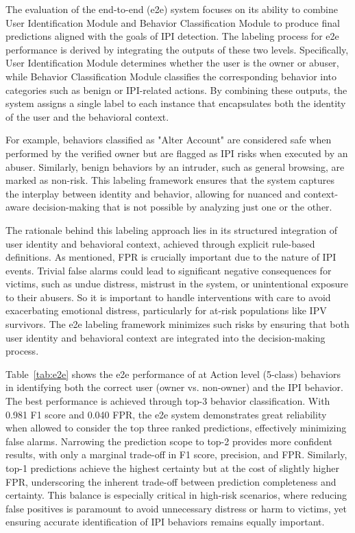     The evaluation of the end-to-end (e2e) system focuses on its ability to combine User Identification Module and Behavior Classification Module to produce final predictions aligned with the goals of IPI detection. The labeling process for e2e performance is derived by integrating the outputs of these two levels. Specifically, User Identification Module determines whether the user is the owner or abuser, while Behavior Classification Module classifies the corresponding behavior into categories such as benign or IPI-related actions. By combining these outputs, the system assigns a single label to each instance that encapsulates both the identity of the user and the behavioral context.

    For example, behaviors classified as "Alter Account" are considered safe when performed by the verified owner but are flagged as IPI risks when executed by an abuser. Similarly, benign behaviors by an intruder, such as general browsing, are marked as non-risk. This labeling framework ensures that the system captures the interplay between identity and behavior, allowing for nuanced and context-aware decision-making that is not possible by analyzing just one or the other.

    The rationale behind this labeling approach lies in its structured integration of user identity and behavioral context, achieved through explicit rule-based definitions. As mentioned, FPR is crucially important due to the nature of IPI events. Trivial false alarms could lead to significant negative consequences for victims, such as undue distress, mistrust in the system, or unintentional exposure to their abusers. So it is important to handle interventions with care to avoid exacerbating emotional distress, particularly for at-risk populations like IPV survivors. The e2e labeling framework minimizes such risks by ensuring that both user identity and behavioral context are integrated into the decision-making process.

    Table~\ref{tab:e2e} shows the e2e performance of \sys at Action level (5-class) behaviors in identifying both the correct user (owner vs. non-owner) and the IPI behavior. The best performance is achieved through top-3 behavior classification. With 0.981 F1 score and 0.040 FPR, the e2e system demonstrates great reliability when allowed to consider the top three ranked predictions, effectively minimizing false alarms. Narrowing the prediction scope to top-2 provides more confident results, with only a marginal trade-off in F1 score, precision, and FPR. Similarly, top-1 predictions achieve the highest certainty but at the cost of slightly higher FPR, underscoring the inherent trade-off between prediction completeness and certainty. This balance is especially critical in high-risk scenarios, where reducing false positives is paramount to avoid unnecessary distress or harm to victims, yet ensuring accurate identification of IPI behaviors remains equally important.

